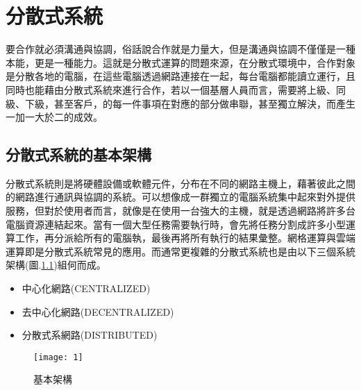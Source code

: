 \chapter{分散式系統}
\renewcommand{\baselinestretch}{10} %
\par
\renewcommand{\baselinestretch}{1} %
\twelve 要合作就必須溝通與協調，俗話說合作就是力量大，但是溝通與協調不僅僅是一種本能，更是一種能力。這就是分散式運算的問題來源，在分散式環境中，合作對象是分散各地的電腦，在這些電腦透過網路連接在一起，每台電腦都能讀立運行，且同時也能藉由分散式系統來進行合作，若以一個基層人員而言，需要將上級、同級、下級，甚至客戶，的每一件事項在對應的部分做串聯，甚至獨立解決，而產生一加一大於二的成效。
\par

\renewcommand{\baselinestretch}{20} %
\section{分散式系統的基本架構}
\par
\renewcommand{\baselinestretch}{1} %
\twelve 分散式系統則是將硬體設備或軟體元件，分布在不同的網路主機上，藉著彼此之間的網路進行通訊與協調的系統。可以想像成一群獨立的電腦系統集中起來對外提供服務，但對於使用者而言，就像是在使用一台強大的主機，就是透過網路將許多台電腦資源連結起來。當有一個大型任務需要執行時，會先將任務分割成許多小型運算工作，再分派給所有的電腦執，最後再將所有執行的結果彙整。網格運算與雲端運算即是分散式系統常見的應用。而通常更複雜的分散式系統也是由以下三個系統架構(圖.\ref{fig.基本架構})組何而成。
\\
\begin{itemize}
	\item 中心化網路(CENTRALIZED)
	\item 去中心化網路(DECENTRALIZED)
	\item 分散式系網路(DISTRIBUTED)
\end{itemize}
\par

\clearpage%
\renewcommand{\baselinestretch}{2} %
\begin{figure}[hbt!]
\begin{center}
\texttt{[image: 1]}
\caption{\large 基本架構}\label{fig.基本架構}
\end{center}
\end{figure}
\par

